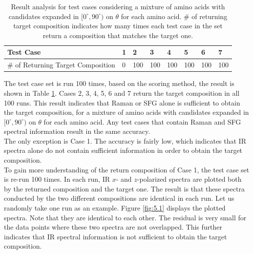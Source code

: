 \begin{table}[ht!]
\begin{center}
{\def\arraystretch{1.5}
\begin{tabular}{| l | l | l | l | l | l | l | l |}
\hline
Test Case & 1 & 2 & 3 & 4 & 5 & 6 & 7 \\ \hline
\# of Returning Target Composition& 0 & 100 & 100 & 100 & 100 & 100 & 100 \\ \hline
\end{tabular} 
}
\end{center}
\caption{Result analysis for test cases considering a mixture of amino acids with candidates expanded in $[0^{\circ}, 90^{\circ})$ on $\theta$ for each amino acid. \# of returning target composition indicates how many times each test case in the set return a composition that matches the target one.}
\label{tab:5.2}
\end{table}	


The test case set is run 100 times, based on the scoring method, the result is shown in 
Table \ref{tab:5.2}. Cases 2, 3, 4, 5, 6 and 7 return the target composition in all 100 runs. This result indicates that Raman or SFG alone is sufficient to obtain the target composition, for a mixture of amino acids with candidates expanded in $[0^{\circ}, 90^{\circ})$ on $\theta$ for each amino acid. Any test cases that contain Raman and SFG spectral information result in the same accuracy. \\

The only exception is Case 1. The accuracy is fairly low, which indicates that IR spectra alone do not contain sufficient information in order to obtain the target composition. \\

To gain more understanding of the return composition of Case 1, the test case set is re-run 100 times. In each run, IR $x$- and $z$-polarized spectra are plotted both by the returned composition and the target one. The result is that these spectra conducted by the two different compositions are identical in each run. Let us randomly take one run as an example. Figure \ref{fig:5.1} displays the plotted spectra. Note that they are identical to each other. The residual is very small for the data points where these two spectra are not overlapped. This further indicates that IR spectral information is not sufficient to obtain the target composition.\\

